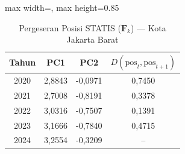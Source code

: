 \begin{table}[H]
\centering
\caption{Pergeseran Posisi STATIS ($\mathbf{F}_k$) --- Kota Jakarta Barat} \label{tab:app2jarak_statis_skor_kota_jakarta_barat}
\begin{adjustbox}{max width=\textwidth, max height=0.85\textheight}
\begin{tabular}{|c|c|c|c|}
\hline
\textbf{Tahun} & \textbf{PC1} & \textbf{PC2} & \textbf{$D(\text{pos}_t, \text{pos}_{t+1})$} \\
\hline
2020 & 2,8843 & -0,0971 & 0,7450 \\
2021 & 2,7008 & -0,8191 & 0,3378 \\
2022 & 3,0316 & -0,7507 & 0,1391 \\
2023 & 3,1666 & -0,7840 & 0,4715 \\
2024 & 3,2554 & -0,3209 & -- \\
\hline
\end{tabular}
\end{adjustbox}
\end{table}
